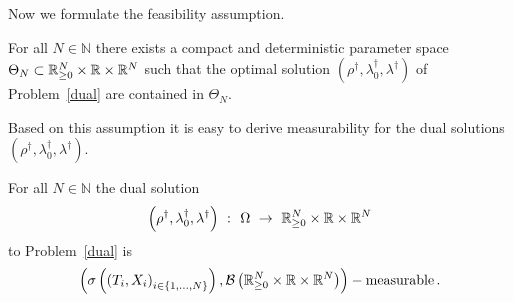 Now we formulate the feasibility assumption.
\begin{assumption}
  \label{asu:feas_dual_sol}
  For all $N\in\mathbb{N}$ there exists a compact and deterministic 
  parameter space 
  $
  \Theta_N
  \subset
  \mathbb{R}^{N}_{\ge 0}
  \times
  \mathbb{R}
  \times
  \mathbb{R}^N
  $
  such that the optimal solution 
  $
  \left( \rho^\dagger,\lambda_0^\dagger,\lambda^\dagger \right)
  $
  of Problem~\ref{dual}
  are contained in $\Theta_N$.
\end{assumption}
Based on this assumption it is easy to derive measurability for the dual solutions 
  $
  \left( \rho^\dagger,\lambda_0^\dagger,\lambda^\dagger \right)
  $.
\begin{lemma}
  \label{lem:meas_dual_sol}
  For all $N\in\mathbb{N}$ the dual solution
  \begin{align*}
  \left( \rho^\dagger,\lambda_0^\dagger,\lambda^\dagger \right)
    \ 
    \colon
   \  
    \Omega
    \ 
    \to
    \ 
  \R^N_{\ge 0}
  \times
  \R
  \times
  \R^{N}
  \end{align*}
  to
  Problem~\ref{dual} 
  is
  \begin{align*}
  \left(
    \sigma \left( \left( T_i,X_i \right)_{i\in \left\{ 1,\ldots,N \right\}} \right),\mathcal{B}
  \left(
  \mathbb{R}^N_{\ge 0}
  \times
  \mathbb{R}
  \times
  \mathbb{R}^{N}
  \right)
  \right)
  -\text{measurable}
  \,.
  \end{align*}
\end{lemma}
